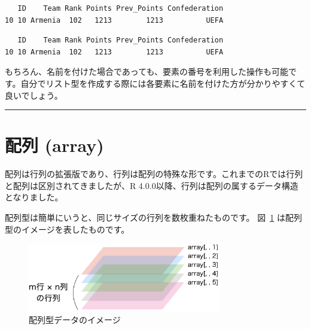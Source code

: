 \documentclass[
  a4paper,
  pandoc,
  ja=standard,
  jafont=haranoaji]{bxjsbook}
\newenvironment{Shaded}{\begin{snugshade}}{\end{snugshade}}
\newcommand{\DecValTok}[1]{\textcolor[rgb]{0.68,0.00,0.00}{#1}}
\newcommand{\NormalTok}[1]{\textcolor[rgb]{0.00,0.48,0.65}{#1}}
\newcommand{\SpecialCharTok}[1]{\textcolor[rgb]{0.37,0.37,0.37}{#1}}
\begin{document}
\begin{verbatim}
   ID    Team Rank Points Prev_Points Confederation
10 10 Armenia  102   1213        1213          UEFA
\end{verbatim}

\begin{Shaded}
\end{Shaded}

\begin{verbatim}
   ID    Team Rank Points Prev_Points Confederation
10 10 Armenia  102   1213        1213          UEFA
\end{verbatim}

もちろん、名前を付けた場合であっても、要素の番号を利用した操作も可能です。自分でリスト型を作成する際には各要素に名前を付けた方が分かりやすくて良いでしょう。

\begin{center}\rule{0.5\linewidth}{0.5pt}\end{center}

\hypertarget{sec-datastructure_array}{%
\section{配列 (array)}\label{sec-datastructure_array}}

配列は行列の拡張版であり、行列は配列の特殊な形です。これまでのRでは行列と配列は区別されてきましたが、R
4.0.0以降、行列は配列の属するデータ構造となりました。

配列型は簡単にいうと、同じサイズの行列を数枚重ねたものです。
図~\ref{fig-structure_array} は配列型のイメージを表したものです。

\begin{figure}

{\centering \includegraphics[width=0.75\textwidth,height=\textheight]{./Figs/DataStructure/array.png}

}

\caption{\label{fig-structure_array}配列型データのイメージ}

\end{figure}
\end{document}
